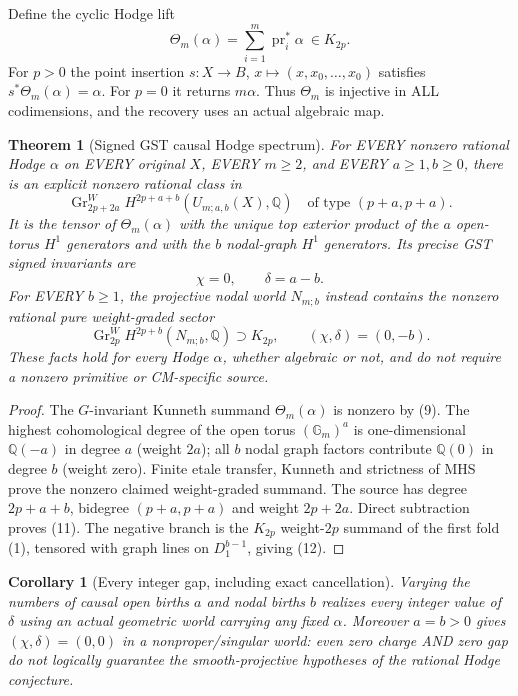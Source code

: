 \documentclass[11pt]{article}
\newtheorem{theorem}{Theorem}
\newtheorem{corollary}{Corollary}
\begin{document}
Define the cyclic Hodge lift
\[
 \Theta_m(\alpha)=\sum_{i=1}^m\operatorname{pr}_i^*\alpha
                 \ \in K_{2p}.
 \tag{9}
\]
For $p>0$ the point insertion
$s:X\to B$, $x\mapsto(x,x_0,\ldots,x_0)$
satisfies $s^*\Theta_m(\alpha)=\alpha$.
For $p=0$ it returns $m\alpha$. Thus
$\Theta_m$ is injective in ALL codimensions, and the
recovery uses an actual algebraic map.

\begin{theorem}[Signed GST causal Hodge spectrum]
For EVERY nonzero rational Hodge $\alpha$ on EVERY original $X$,
EVERY $m\ge2$, and EVERY $a\ge1,b\ge0$, there is an
explicit nonzero rational class in
\[
  \operatorname{Gr}^{W}_{2p+2a}
       H^{2p+a+b}(U_{m;a,b}(X),\mathbb Q)
 \quad\text{of type }(p+a,p+a).
 \tag{10}
\]
It is the tensor of $\Theta_m(\alpha)$ with the unique
top exterior product of the $a$ open-torus $H^1$ generators
and with the $b$ nodal-graph $H^1$ generators.
Its precise GST signed invariants are
\[
 \boxed{\chi=0,\qquad \delta=a-b.}
 \tag{11}
\]
For EVERY $b\ge1$, the projective nodal world $N_{m;b}$
instead contains the nonzero rational pure weight-graded sector
\[
 \operatorname{Gr}^{W}_{2p}
 H^{2p+b}(N_{m;b},\mathbb Q)\supset K_{2p},
 \qquad(\chi,\delta)=(0,-b).
 \tag{12}
\]
These facts hold for every Hodge $\alpha$, whether
algebraic or not, and do not require a nonzero
primitive or CM-specific source.
\end{theorem}
\begin{proof}
The $G$-invariant Kunneth summand $\Theta_m(\alpha)$
is nonzero by (9). The highest cohomological degree of
the open torus $(\mathbb G_m)^a$ is one-dimensional
$\mathbb Q(-a)$ in degree $a$ (weight $2a$);
all $b$ nodal graph factors contribute
$\mathbb Q(0)$ in degree $b$ (weight zero).
Finite etale transfer, Kunneth and strictness of MHS
prove the nonzero claimed weight-graded summand.
The source has degree $2p+a+b$, bidegree
$(p+a,p+a)$ and weight $2p+2a$. Direct subtraction
proves (11).  The negative branch is the $K_{2p}$
weight-$2p$ summand of the first fold (1), tensored
with graph lines on $D_1^{b-1}$, giving (12).
\end{proof}

\begin{corollary}[Every integer gap, including exact cancellation]
Varying the numbers of causal open births $a$ and nodal births
$b$ realizes \emph{every integer value of $\delta$}
using an actual geometric world carrying any fixed $\alpha$.
Moreover $a=b>0$ gives $(\chi,\delta)=(0,0)$ in a
nonproper/singular world: even zero charge AND zero gap
do not logically guarantee the smooth-projective
hypotheses of the rational Hodge conjecture.
\end{corollary}
\end{document}

